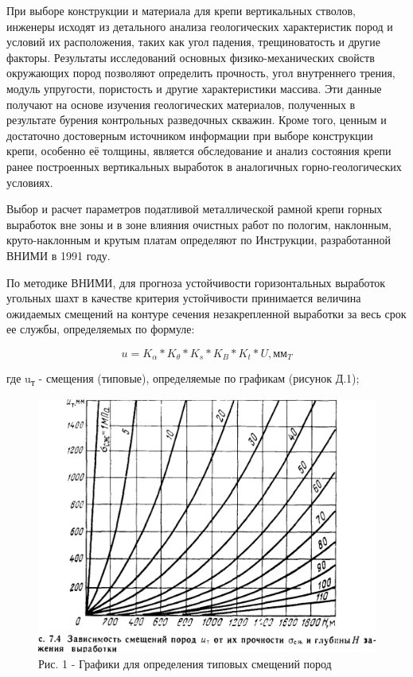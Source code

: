 \begin{multicols}{2}
При выборе конструкции и материала для крепи вертикальных стволов,
инженеры исходят из детального анализа геологических характеристик пород
и условий их расположения, таких как угол падения, трещиноватость и
другие факторы. Результаты исследований основных физико-механических
свойств окружающих пород позволяют определить прочность, угол
внутреннего трения, модуль упругости, пористость и другие характеристики
массива. Эти данные получают на основе изучения геологических
материалов, полученных в результате бурения контрольных разведочных
скважин. Кроме того, ценным и достаточно достоверным источником
информации при выборе конструкции крепи, особенно её толщины, является
обследование и анализ состояния крепи ранее построенных вертикальных
выработок в аналогичных горно-геологических условиях.

Выбор и расчет параметров податливой металлической рамной крепи горных
выработок вне зоны и в зоне влияния очистных работ по пологим,
наклонным, круто-наклонным и крутым платам определяют по Инструкции,
разработанной ВНИМИ в 1991 году.

По методике ВНИМИ, для прогноза устойчивости горизонтальных выработок
угольных шахт в качестве критерия устойчивости принимается величина
ожидаемых смещений на контуре сечения незакрепленной выработки за весь
срок ее службы, определяемых по формуле:

\begin{equation}
u = K_{\alpha} * K_{\theta} * K_{s} * K_{B} * K_{t} * U, \text{мм}_{T}
\end{equation}

где u\textsubscript{т} - смещения (типовые), определяемые по графикам
(рисунок Д.1);

\begin{figure}[H]
	\centering
	\includegraphics[width=\linewidth]{assets/1124}
	\caption*{Рис. 1 - Графики для определения типовых смещений пород}
\end{figure}


\end{multicols}
